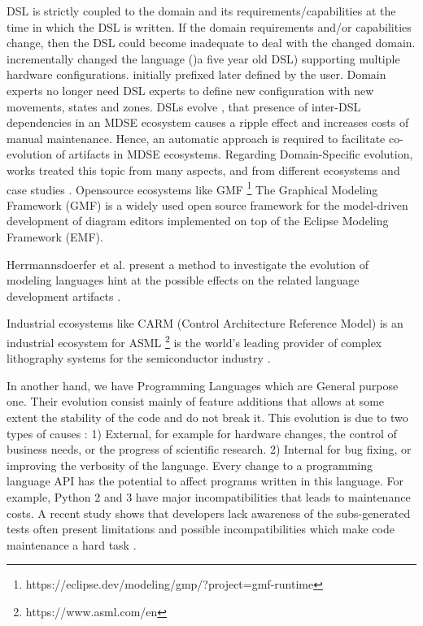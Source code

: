  
  DSL is strictly coupled to the domain and
  its requirements/capabilities at the time in which the DSL is written. If the domain requirements and/or capabilities change, then the DSL could become inadequate to deal with the changed domain.
  \cite{schuts2021industrial}  incrementally changed the language ()a five year old DSL) supporting multiple hardware configurations. initially prefixed later defined by the user. Domain experts no longer need DSL experts to define new configuration with new movements, states and zones.
  DSLs evolve \cite{favre2005languages,herrmannsdorfer2013coupled}, 
  that presence of inter-DSL dependencies in an MDSE ecosystem causes a ripple effect and increases costs of manual maintenance. Hence, an automatic approach is required to facilitate co-evolution of artifacts in MDSE ecosystems.
   Regarding Domain-Specific evolution, works treated this topic from many aspects, and from different ecosystems and case studies \cite{mengerink2016dsl}.
  Opensource ecosystems like GMF \footnote{https://eclipse.dev/modeling/gmp/?project=gmf-runtime} The Graphical Modeling Framework (GMF) is a widely used open source framework for the model-driven development of diagram editors implemented on top of the Eclipse Modeling Framework (EMF).
 
  
Herrmannsdoerfer et al. present a method to investigate the evolution of modeling languages
  hint at the possible effects on the related language development artifacts  \cite{10.1007/978-3-642-12107-4_3}.
  
    
Industrial  ecosystems like CARM (Control Architecture Reference Model) is an industrial ecosystem for ASML \footnote{https://www.asml.com/en} is the world’s leading provider of complex lithography systems for the semiconductor industry  \cite{mengerink2016dsl}.

In another hand, we have Programming Languages which are General purpose one. Their evolution consist mainly of feature additions that allows at some extent the stability of the code and do not break it.
 This evolution is due to two types of causes : 1) External, for example for hardware changes, the control of business needs, or the progress of scientific research. 2) Internal for bug fixing, or improving the verbosity of the language.
 Every change to a programming language API has the potential to affect programs written
 in this language. For example, Python 2 and 3 have major incompatibilities that leads to maintenance costs.
 A recent study shows that developers lack awareness of the subs-generated tests
 often present limitations and possible incompatibilities which make code maintenance a hard task \cite{dietrich2016java}.
 

